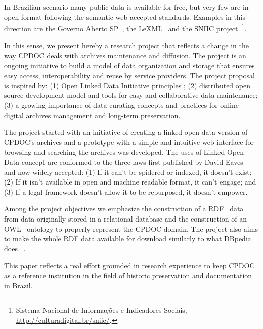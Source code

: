 In Brazilian scenario many 
public data is available for free, but very few are in open
format following the semantic web accepted standards. Examples in this
direction are the Governo Aberto SP~\cite{gasp}, the
LeXML~\cite{lexml} and the SNIIC project~\footnote{Sistema Nacional de
  Informações e Indicadores Sociais,
  \url{http://culturadigital.br/sniic/}.}.

In this sense, we present hereby a research project that reflects a change in
the way CPDOC deals with archives maintenance and
diffusion. The project is an ongoing initiative to build a model of
data organization and storage that ensures easy access,
interoperability and reuse by service providers. The project proposal
is inspired by: (1) Open Linked Data Initiative principles \cite{odi};
(2) distributed open source development model and tools for easy and
collaborative data maintenance; (3) a growing importance of data
curating concepts and practices for online digital archives management
and long-term preservation.
   
The project started with an initiative of creating a linked open data
version of CPDOC's archives and a prototype with a simple and intuitive
web interface for browsing and searching the archives was developed. The uses of
Linked Open Data concept are conformed to the three laws first
published by David Eaves~\cite{3-law} and now widely accepted: (1) If
it can't be spidered or indexed, it doesn't exist; (2) If it isn't
available in open and machine readable format, it can't engage; and
(3) If a legal framework doesn't allow it to be repurposed, it doesn't
empower. %

Among the project objectives we emphasize the construction of
a RDF~\cite{rdf-primer} data from data originally stored in a
relational database and the construction of an OWL~\cite{owl} ontology to
properly represent the CPDOC domain.
The project also aims to make the whole RDF data available for
download similarly to what DBpedia does ~\cite{dbpedia}. 

   
This paper reflects a real effort grounded in research experience to
keep CPDOC as a reference institution in the field of historic
preservation and documentation in Brazil.

